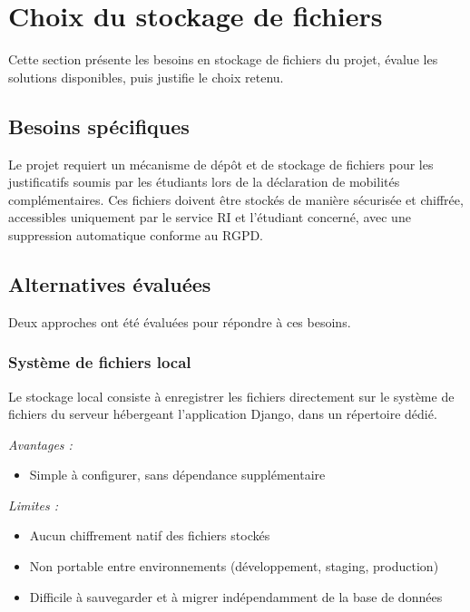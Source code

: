 \section{Choix du stockage de fichiers}

Cette section présente les besoins en stockage de fichiers du projet,
évalue les solutions disponibles, puis justifie le choix retenu.

\subsection{Besoins spécifiques}

Le projet requiert un mécanisme de dépôt et de stockage de fichiers pour
les justificatifs soumis par les étudiants lors de la déclaration de
mobilités complémentaires. Ces fichiers doivent être stockés de manière
sécurisée et chiffrée, accessibles uniquement par le service RI et
l'étudiant concerné, avec une suppression automatique conforme au RGPD.

\subsection{Alternatives évaluées}

Deux approches ont été évaluées pour répondre à ces besoins.

\subsubsection{Système de fichiers local}

Le stockage local consiste à enregistrer les fichiers directement sur
le système de fichiers du serveur hébergeant l'application Django,
dans un répertoire dédié.

\textit{Avantages :}
\begin{itemize}
  \item Simple à configurer, sans dépendance supplémentaire
\end{itemize}

\textit{Limites :}
\begin{itemize}
  \item Aucun chiffrement natif des fichiers stockés
  \item Non portable entre environnements (développement, staging,
        production)
  \item Difficile à sauvegarder et à migrer indépendamment
        de la base de données
\end{itemize}

